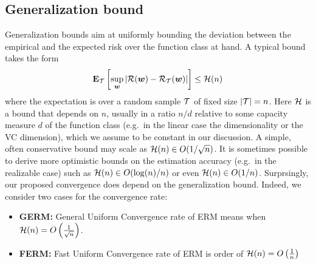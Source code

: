 \documentclass{article}
\begin{document}
\subsection{Generalization bound}
Generalization bounds aim at uniformly bounding the deviation between the empirical and the expected risk over the function class at hand. A typical bound takes the form
\begin{equation*}
\mathbf{E}_{\cal T} \left[ \sup_{\bm{w}} \left| {\cal R}(\bm{w}) - {\cal R}_{\cal T}(\bm{w}) \right| \right]  \leq
{\cal H}(n) \label{eq:bound}
\end{equation*} 
where the expectation is over a random sample ${\cal T}$ of fixed size $|{\cal T}|=n$. 
Here ${\cal H}$ is a bound that depends on $n$, usually in a ratio $n/d$ relative to some capacity measure $d$ 
of the function class (e.g.~in the linear case the dimensionality or the VC dimension), which we assume to be constant in our discussion.  
A simple, often conservative bound may scale as ${\cal H}(n) \in O(1/\sqrt{n})$. 
It is sometimes possible to derive more optimistic bounds on the estimation accuracy (e.g.~in the realizable case) 
such as ${\cal H}(n) \in O(\log(n)/n)$ or even ${\cal H}(n) \in O(1/n)$. 
 Surprsingly, our proposed convergence does depend on the generalization bound.
 Indeed, we consider two cases for the convergence rate: 
 \begin{itemize}
   \item \textbf{GERM: } General Uniform Convergence rate of ERM
  means when  ${\cal H}(n) =
   O\left(\frac{1}{\sqrt{n}}\right)$. 
   \item \textbf{FERM: }Fast Uniform Convergence rate of ERM
   is order of ${\cal H}(n) = O \left( \frac{1}{n} \right)$ 
 \end{itemize}
 
\end{document}
